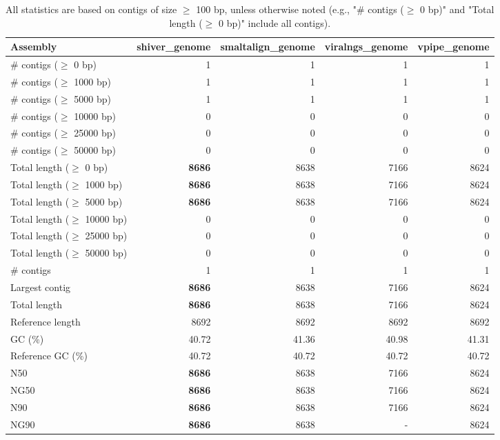 \documentclass[12pt,a4paper]{article}
\begin{document}
\begin{table}[ht]
\begin{center}
\caption{All statistics are based on contigs of size $\geq$ 100 bp, unless otherwise noted (e.g., "\# contigs ($\geq$ 0 bp)" and "Total length ($\geq$ 0 bp)" include all contigs).}
\begin{tabular}{|l*{4}{|r}|}
\hline
Assembly & shiver\_genome & smaltalign\_genome & viralngs\_genome & vpipe\_genome \\ \hline
\# contigs ($\geq$ 0 bp) & 1 & 1 & 1 & 1 \\ \hline
\# contigs ($\geq$ 1000 bp) & 1 & 1 & 1 & 1 \\ \hline
\# contigs ($\geq$ 5000 bp) & 1 & 1 & 1 & 1 \\ \hline
\# contigs ($\geq$ 10000 bp) & 0 & 0 & 0 & 0 \\ \hline
\# contigs ($\geq$ 25000 bp) & 0 & 0 & 0 & 0 \\ \hline
\# contigs ($\geq$ 50000 bp) & 0 & 0 & 0 & 0 \\ \hline
Total length ($\geq$ 0 bp) & {\bf 8686} & 8638 & 7166 & 8624 \\ \hline
Total length ($\geq$ 1000 bp) & {\bf 8686} & 8638 & 7166 & 8624 \\ \hline
Total length ($\geq$ 5000 bp) & {\bf 8686} & 8638 & 7166 & 8624 \\ \hline
Total length ($\geq$ 10000 bp) & 0 & 0 & 0 & 0 \\ \hline
Total length ($\geq$ 25000 bp) & 0 & 0 & 0 & 0 \\ \hline
Total length ($\geq$ 50000 bp) & 0 & 0 & 0 & 0 \\ \hline
\# contigs & 1 & 1 & 1 & 1 \\ \hline
Largest contig & {\bf 8686} & 8638 & 7166 & 8624 \\ \hline
Total length & {\bf 8686} & 8638 & 7166 & 8624 \\ \hline
Reference length & 8692 & 8692 & 8692 & 8692 \\ \hline
GC (\%) & 40.72 & 41.36 & 40.98 & 41.31 \\ \hline
Reference GC (\%) & 40.72 & 40.72 & 40.72 & 40.72 \\ \hline
N50 & {\bf 8686} & 8638 & 7166 & 8624 \\ \hline
NG50 & {\bf 8686} & 8638 & 7166 & 8624 \\ \hline
N90 & {\bf 8686} & 8638 & 7166 & 8624 \\ \hline
NG90 & {\bf 8686} & 8638 & - & 8624 \\ \hline

\end{tabular}
\end{center}
\end{table}
\end{document}
